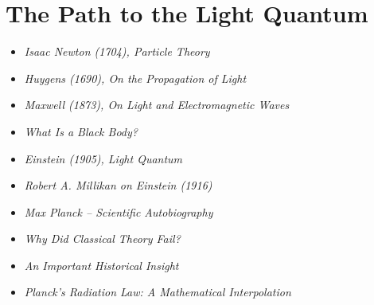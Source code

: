 \section{The Path to the Light Quantum}
\vspace{1em}
\begin{tcolorbox}[title=Physics Boxes, physikbox]
	\begin{itemize}
		\item \emph{Isaac Newton (1704), Particle Theory} \dotfill\pageref{box:newton}
		\item \emph{Huygens (1690), On the Propagation of Light}\dotfill\pageref{box:huygens}
		\item \emph{Maxwell (1873), On Light and \newline Electromagnetic Waves} \dotfill\pageref{box:maxwell}
		\item \emph{What Is a Black Body?} \dotfill\pageref{box:schwarzerkoerper}
		\item \emph{Einstein (1905), Light Quantum}\dotfill\pageref{box:einstein-lichtquant}
		\item \emph{Robert A. Millikan on Einstein (1916)} \dotfill\pageref{box:millikan-einstein}
		\item \emph{Max Planck – Scientific Autobiography}\dotfill\pageref{box:planck-zitat}
	\end{itemize}
\end{tcolorbox}

\vspace{1em}
\begin{tcolorbox}[title=Didactics Boxes, didaktikbox]
	\begin{itemize}
		\item \emph{Why Did Classical Theory Fail?} \dotfill\pageref{box:klassik-versagt}
		\item \emph{An Important Historical Insight} \dotfill\pageref{box:geschichte-planck}
	\end{itemize}
\end{tcolorbox}

\vspace{1em}
\begin{tcolorbox}[title=Math Boxes, mathebox]
	\begin{itemize}
		\item \emph{Planck’s Radiation \newline Law: A Mathematical Interpolation}\dotfill\pageref{box:planck-interpolation}
	\end{itemize}
\end{tcolorbox}

